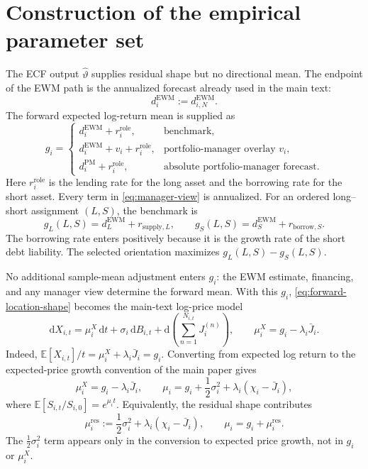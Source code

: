 \documentclass[11pt]{article}
\newcommand{\E}{\mathbb{E}}
\newcommand{\diff}{\mathrm{d}}
\begin{document}
\section{Construction of the empirical parameter set}\label{sec:external-mean}

The ECF output $\widehat\vartheta$ supplies residual shape but no directional mean. The
endpoint of the EWM path is the annualized forecast already used in the main text:
\begin{equation}\label{eq:directional-input}
d_i^{\mathrm{EWM}}:=d_{i,N}^{\mathrm{EWM}}.
\end{equation}
The forward expected log-return mean is supplied as
\begin{equation}\label{eq:manager-view}
g_i
=\begin{cases}
d_i^{\mathrm{EWM}}+r_i^{\mathrm{role}},
&\text{benchmark},\\
d_i^{\mathrm{EWM}}+v_i+r_i^{\mathrm{role}},
&\text{portfolio-manager overlay }v_i,\\
d_i^{\mathrm{PM}}+r_i^{\mathrm{role}},
&\text{absolute portfolio-manager forecast}.
\end{cases}
\end{equation}
Here $r_i^{\mathrm{role}}$ is the lending rate for the long asset and the borrowing rate for
the short asset. Every term in \eqref{eq:manager-view} is annualized. For an ordered
long--short assignment $(L,S)$, the benchmark is
\begin{equation}\label{eq:role-adjusted-log-mean}
g_L(L,S)=d_L^{\mathrm{EWM}}+r_{\mathrm{supply},L},
\qquad
g_S(L,S)=d_S^{\mathrm{EWM}}+r_{\mathrm{borrow},S}.
\end{equation}
The borrowing rate enters positively because it is the growth rate of the short debt
liability. The selected orientation maximizes $g_L(L,S)-g_S(L,S)$.

No additional sample-mean adjustment enters $g_i$: the EWM estimate, financing, and any
manager view determine the forward mean. With this $g_i$,
\eqref{eq:forward-location-shape} becomes the main-text log-price model
\begin{equation}\label{eq:forward-process}
\diff X_{i,t}
=\mu_i^X\,\diff t+\sigma_i\,\diff B_{i,t}
+\diff\!\left(\sum_{n=1}^{N_{i,t}}J_i^{(n)}\right),
\qquad
\mu_i^X=g_i-\lambda_i\bar J_i.
\end{equation}
Indeed, $\E[X_{i,t}]/t=\mu_i^X+\lambda_i\bar J_i=g_i$. Converting from expected log
return to the expected-price growth convention of the main paper gives
\begin{equation}\label{eq:drift-reinsertion}
\boxed{\mu_i^X=g_i-\lambda_i\bar J_i},
\qquad
\boxed{\mu_i=g_i+\frac12\sigma_i^2+\lambda_i(\chi_i-\bar J_i)},
\end{equation}
where $\E[S_{i,t}/S_{i,0}]=e^{\mu_i t}$. Equivalently, the residual shape contributes
\begin{equation}\label{eq:residual-mu}
\mu_i^{\mathrm{res}}
:=\frac12\sigma_i^2+\lambda_i(\chi_i-\bar J_i),
\qquad
\mu_i=g_i+\mu_i^{\mathrm{res}}.
\end{equation}
The $\tfrac12\sigma_i^2$ term appears only in the conversion to expected price growth, not
in $g_i$ or $\mu_i^X$.
\end{document}
